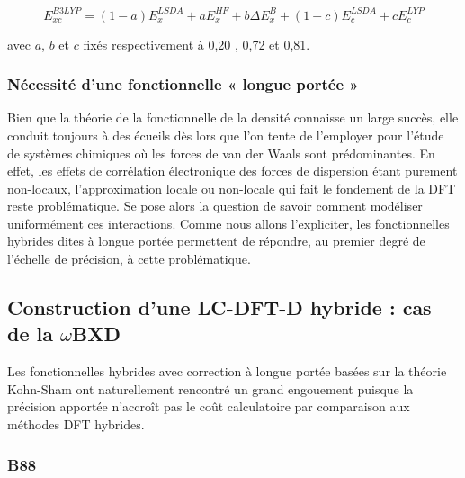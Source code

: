 	\begin{equation}
	E_{xc}^{B3LYP} = (1-a) E_{x}^{LSDA} + a E_{x}^{HF} + b \Delta E_{x}^{B} + (1-c) E_{c}^{LSDA} + c E_{c}^{LYP}
	\label{B3LYP}
	\end{equation}
	
	\noindent avec $a$, $b$ et $c$ fixés respectivement à 0,20 , 0,72 et 0,81.
	
	
	\subsubsection{Nécessité d'une fonctionnelle « longue portée »}
	
	Bien que la théorie de la fonctionnelle de la densité connaisse un large succès, elle conduit toujours à des écueils dès lors que l'on tente de l'employer pour l'étude de systèmes chimiques où les forces de van der Waals sont prédominantes. 
	En effet, les effets de corrélation électronique des forces de dispersion étant purement non-locaux, l'approximation locale ou non-locale qui fait le fondement de la DFT reste problématique. Se pose alors la question de savoir comment modéliser uniformément ces interactions.
	 Comme nous allons l'expliciter, les fonctionnelles hybrides dites \og à longue portée \fg{} permettent de répondre, au premier degré de l'échelle de précision, à cette problématique. 
	
	
	\subsection[LC-DFT-D hybride : $\omega$BXD]{Construction d'une LC-DFT-D hybride : cas de la $\omega$BXD}
	Les fonctionnelles hybrides avec correction à longue portée basées sur la théorie Kohn-Sham ont naturellement rencontré un grand engouement puisque la précision apportée n'accroît pas le coût calculatoire par comparaison aux méthodes DFT hybrides.
	
	\subsubsection{B88}
	
